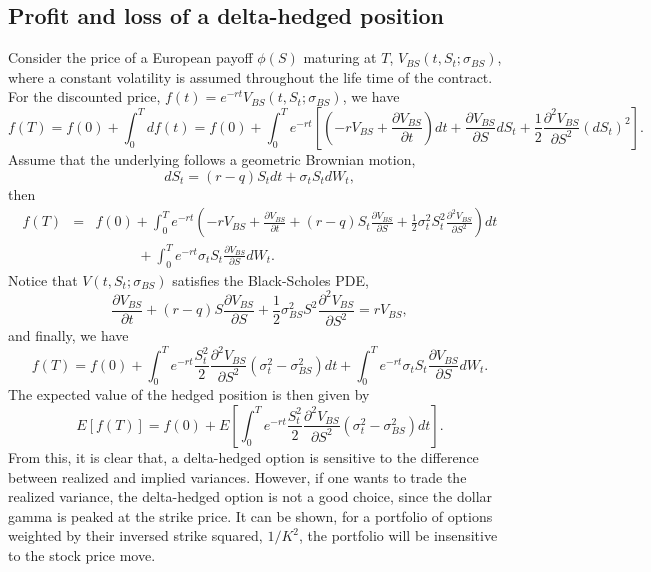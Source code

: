 \documentclass[12pt]{article}
\begin{document}
  \subsection{Profit and loss of a delta-hedged position}

    Consider the price of a European payoff $\phi(S)$ maturing at $T$, $V_{BS}(t,S_t;\sigma_{BS})$, where a constant volatility
    is assumed throughout the life time of the contract.
    For the discounted price, $f(t)=e^{-rt}V_{BS}(t,S_t;\sigma_{BS})$, we have
    \begin{equation}
      f(T)=f(0)+\int_0^Tdf(t)=f(0)+\int_0^Te^{-rt}\left[\left(-rV_{BS}+\frac{\partial V_{BS}}{\partial t}\right)dt+\frac{\partial V_{BS}}{\partial S}dS_t
              +\frac{1}{2}\frac{\partial^2 V_{BS}}{\partial S^2}\left(dS_t\right)^2\right].
    \end{equation}
    Assume that the underlying follows a geometric Brownian motion,
    \begin{equation}
      dS_t = \left(r-q\right)S_tdt + \sigma_tS_tdW_t,
    \end{equation}
    then
    \begin{eqnarray}
      f(T)&=&f(0)+\int_0^Te^{-rt}\left(-rV_{BS}+\frac{\partial V_{BS}}{\partial t}+\left(r-q\right)S_t\frac{\partial V_{BS}}{\partial S}
                                +\frac{1}{2}\sigma_t^2S_t^2\frac{\partial^2 V_{BS}}{\partial S^2}\right)dt\nonumber\\
          &&\quad\quad\quad+\int_0^Te^{-rt}\sigma_tS_t\frac{\partial V_{BS}}{\partial S}dW_t.
    \end{eqnarray}
    Notice that  $V(t,S_t;\sigma_{BS})$ satisfies the Black-Scholes PDE,
    \begin{equation}
      \frac{\partial V_{BS}}{\partial t}+\left(r-q\right)S\frac{\partial V_{BS}}{\partial S}+\frac{1}{2}\sigma_{BS}^2S^2\frac{\partial^2 V_{BS}}{\partial S^2}
      =rV_{BS},
    \end{equation}
    and finally, we have
    \begin{equation}
      f(T)=f(0)+\int_0^Te^{-rt}\frac{S_t^2}{2}\frac{\partial^2 V_{BS}}{\partial S^2}\left(\sigma_t^2-\sigma_{BS}^2\right)dt+\int_0^Te^{-rt}\sigma_tS_t\frac{\partial V_{BS}}{\partial S}dW_t.
      \label{average}
    \end{equation}
    The expected value of the hedged position is then given by
    \begin{equation}
      E\left[f(T)\right]=f(0)+E\left[\int_0^Te^{-rt}\frac{S_t^2}{2}\frac{\partial^2 V_{BS}}{\partial S^2}\left(\sigma_t^2-\sigma_{BS}^2\right)dt\right].
    \end{equation}
    From this, it is clear that, a delta-hedged option is sensitive to the difference between realized and implied variances.
    However, if one wants to trade
    the realized variance, the delta-hedged option is not a good choice, since the dollar gamma is peaked at the strike price.
    It can be shown, for a portfolio
    of options weighted by their inversed strike squared, $1/K^2$, the portfolio will be insensitive to the stock price move.
\end{document}
